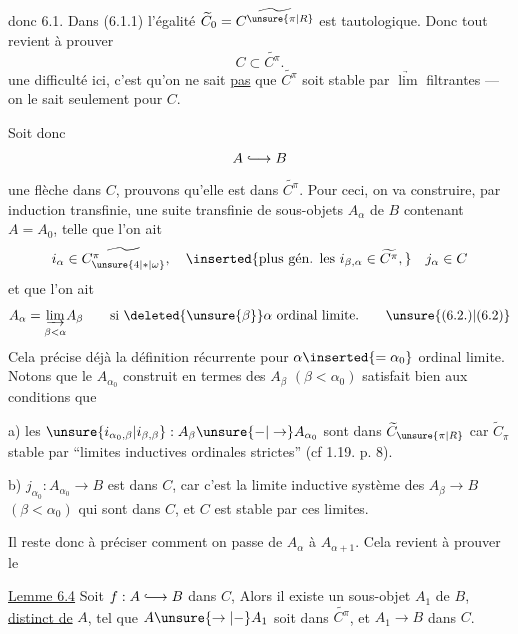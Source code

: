  donc 6.1. Dans (6.1.1) l'égalité $\widetilde C_0=\widetilde{C^{\unsure{\pi|R}}}$ est tautologique. Donc tout revient à prouver
\[
 C\subset\widetilde{C^\pi}.
\]
une difficulté ici, c'est qu'on ne sait \uline{pas} que $\widetilde{C^\pi}$ soit stable par $\underrightarrow{\lim}$ filtrantes --- on le sait seulement pour $C$.

Soit donc
\[
 A\lhook\joinrel\longrightarrow B
\]
une flèche dans $C$, prouvons qu'elle est dans $\widetilde{C^\pi}$. Pour ceci, on  va construire, par induction transfinie, une suite transfinie  de sous-objets $A_\alpha$ de $B$ contenant $A=A_0$, 
telle que l'on ait
\[
 i_\alpha\in\widetilde{C^{\pi}_{\unsure{4|\ast|\omega}}},\quad
 \inserted{\text{plus gén. les }i_{\beta,\alpha}\in\widetilde{C^\pi},}\quad j_\alpha\in C
\]
et que l'on ait
\[
 A_\alpha=\underset{\beta<\alpha}{\underrightarrow{\lim}}A_\beta
 \qquad\text{si }\deleted{\unsure{\beta}}\alpha\text{ ordinal limite.}
 \tag*{\unsure{(6.2.)|(6.2)}}
\]
Cela précise déjà la définition récurrente pour $\alpha\inserted{=\alpha_0}$ ordinal limite. Notons que le $A_{\alpha_0}$ construit en termes des $A_\beta$ $(\beta<\alpha_0)$ satisfait bien aux conditions que

a) les $\unsure{i_{\alpha_0,\beta}|i_{\beta,\beta}}:A_\beta\unsure{-|\to} A_{\alpha_0}$ sont dans $\widetilde C_{\unsure{\pi|R}}$  car $\widetilde C_\pi$ stable par ``limites inductives ordinales strictes'' (cf 1.19. p. 8).

b) $j_{\alpha_0}: A_{\alpha_0}\longrightarrow B$ est dans $C$, car c'est la limite inductive    système des $A_\beta\to B$ $(\beta<\alpha_0)$ qui sont dans $C$, et $C$ est stable par ces limites.

Il reste donc à préciser comment on passe de $A_\alpha$ à $A_{\alpha+1}$. Cela revient à prouver le

\uline{Lemme 6.4} Soit $f:A\lhook\joinrel\longrightarrow B$ dans $C$,  Alors il existe un sous-objet $A_1$ de $B$, \uline{distinct de} $A$, tel que $A\unsure{\to|-} A_1$ soit dans $\widetilde{C^\pi}$, et $A_1\to B$ dans $C$.

